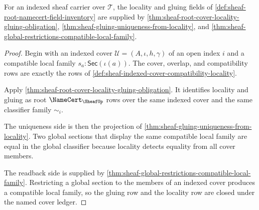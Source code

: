 \begin{theorem}
\label{thm:sheaf-root-namecert-locality-gluing-fields}
For an indexed sheaf carrier over $\mathcal{T}$, the locality and gluing fields of \autoref{def:sheaf-root-namecert-field-inventory} are supplied by \autoref{thm:sheaf-root-cover-locality-gluing-obligation}, \autoref{thm:sheaf-gluing-uniqueness-from-locality}, and \autoref{thm:sheaf-global-restrictions-compatible-local-family}.
\end{theorem}
\begin{proof}
Begin with an indexed cover $\mathcal{U}=(A,\iota,h,\gamma)$ of an open index $i$ and a compatible local family $s_a:\mathsf{Sec}(\iota(a))$. The cover, overlap, and compatibility rows are exactly the rows of \autoref{def:sheaf-indexed-cover-compatibility-locality}.

Apply \autoref{thm:sheaf-root-cover-locality-gluing-obligation}. It identifies locality and gluing as root $\NameCert_{\SheafUp}$ rows over the same indexed cover and the same classifier family $\sim_i$.

The uniqueness side is then the projection of \autoref{thm:sheaf-gluing-uniqueness-from-locality}. Two global sections that display the same compatible local family are equal in the global classifier because locality detects equality from all cover members.

The readback side is supplied by \autoref{thm:sheaf-global-restrictions-compatible-local-family}. Restricting a global section to the members of an indexed cover produces a compatible local family, so the gluing row and the locality row are closed under the named cover ledger.
\end{proof}

